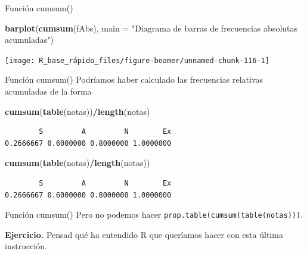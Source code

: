 \documentclass[
  ignorenonframetext,
  aspectratio=169]{beamer}
\newenvironment{Shaded}{\begin{snugshade}}{\end{snugshade}}
\newcommand{\AttributeTok}[1]{\textcolor[rgb]{0.13,0.29,0.53}{#1}}
\newcommand{\FunctionTok}[1]{\textcolor[rgb]{0.13,0.29,0.53}{\textbf{#1}}}
\newcommand{\NormalTok}[1]{#1}
\newcommand{\SpecialCharTok}[1]{\textcolor[rgb]{0.81,0.36,0.00}{\textbf{#1}}}
\newcommand{\StringTok}[1]{\textcolor[rgb]{0.31,0.60,0.02}{#1}}
\begin{document}
\begin{frame}[fragile]{Función cumsum()}
\label{funciuxf3n-cumsum-2}
\begin{Shaded}
\begin{Highlighting}[]
\FunctionTok{barplot}\NormalTok{(}\FunctionTok{cumsum}\NormalTok{(fAbs), }\AttributeTok{main =} \StringTok{"Diagrama de barras de }
\StringTok{    frecuencias absolutas acumuladas"}\NormalTok{)}
\end{Highlighting}
\end{Shaded}

\begin{center}\texttt{[image: R\_base\_rápido\_files/figure-beamer/unnamed-chunk-116-1]} \end{center}
\end{frame}

\begin{frame}[fragile]{Función cumsum()}
\label{funciuxf3n-cumsum-3}
Podríamos haber calculado las frecuencias relativas acumuladas de la
forma

\begin{Shaded}
\begin{Highlighting}[]
\FunctionTok{cumsum}\NormalTok{(}\FunctionTok{table}\NormalTok{(notas))}\SpecialCharTok{/}\FunctionTok{length}\NormalTok{(notas)}
\end{Highlighting}
\end{Shaded}

\begin{verbatim}
        S         A         N        Ex 
0.2666667 0.6000000 0.8000000 1.0000000 
\end{verbatim}

\begin{Shaded}
\begin{Highlighting}[]
\FunctionTok{cumsum}\NormalTok{(}\FunctionTok{table}\NormalTok{(notas)}\SpecialCharTok{/}\FunctionTok{length}\NormalTok{(notas))}
\end{Highlighting}
\end{Shaded}

\begin{verbatim}
        S         A         N        Ex 
0.2666667 0.6000000 0.8000000 1.0000000 
\end{verbatim}
\end{frame}

\begin{frame}[fragile]{Función cumsum()}
\label{funciuxf3n-cumsum-4}
Pero no podemos hacer \texttt{prop.table(cumsum(table(notas)))}.

\textbf{Ejercicio.} Pensad qué ha entendido R que queríamos hacer con
esta última instrucción.
\end{frame}
\end{document}
